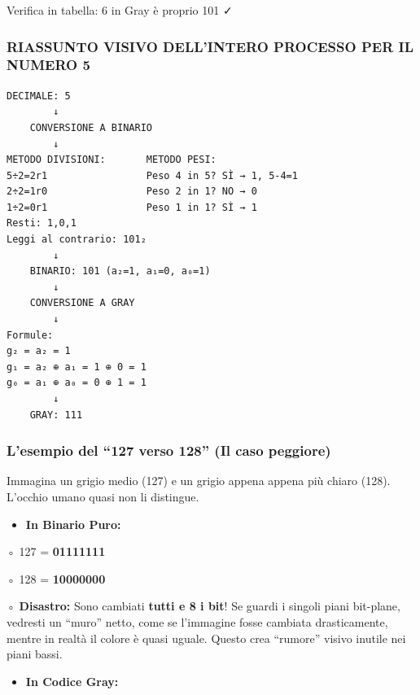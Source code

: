 \documentclass[
]{article}
\providecommand{\tightlist}{%
  \setlength{\itemsep}{0pt}\setlength{\parskip}{0pt}}
\begin{document}
Verifica in tabella: 6 in Gray è proprio 101 ✓

\hypertarget{riassunto-visivo-dellintero-processo-per-il-numero-5}{%
\subsubsection{\texorpdfstring{\textbf{RIASSUNTO VISIVO DELL'INTERO PROCESSO PER IL NUMERO 5}}{RIASSUNTO VISIVO DELL'INTERO PROCESSO PER IL NUMERO 5}}\label{riassunto-visivo-dellintero-processo-per-il-numero-5}}

\begin{verbatim}
DECIMALE: 5
        ↓
    CONVERSIONE A BINARIO
        ↓
METODO DIVISIONI:       METODO PESI:
5÷2=2r1                 Peso 4 in 5? SÌ → 1, 5-4=1
2÷2=1r0                 Peso 2 in 1? NO → 0
1÷2=0r1                 Peso 1 in 1? SÌ → 1
Resti: 1,0,1
Leggi al contrario: 101₂
        ↓
    BINARIO: 101 (a₂=1, a₁=0, a₀=1)
        ↓
    CONVERSIONE A GRAY
        ↓
Formule:
g₂ = a₂ = 1
g₁ = a₂ ⊕ a₁ = 1 ⊕ 0 = 1
g₀ = a₁ ⊕ a₀ = 0 ⊕ 1 = 1
        ↓
    GRAY: 111
\end{verbatim}

\hypertarget{lesempio-del-127-verso-128-il-caso-peggiore}{%
\subsubsection{L'esempio del ``127 verso 128'' (Il caso peggiore)}\label{lesempio-del-127-verso-128-il-caso-peggiore}}

Immagina un grigio medio (127) e un grigio appena appena più chiaro (128). L'occhio umano quasi non li distingue.

\begin{itemize}
\tightlist
\item
  \textbf{In Binario Puro:}
\end{itemize}

◦ 127 = \textbf{01111111}

◦ 128 = \textbf{10000000}

◦ \textbf{Disastro:} Sono cambiati \textbf{tutti e 8 i bit}! Se guardi i singoli piani bit-plane, vedresti un ``muro'' netto, come se l'immagine fosse cambiata drasticamente, mentre in realtà il colore è quasi uguale. Questo crea ``rumore'' visivo inutile nei piani bassi.

\begin{itemize}
\tightlist
\item
  \textbf{In Codice Gray:}
\end{itemize}
\end{document}

